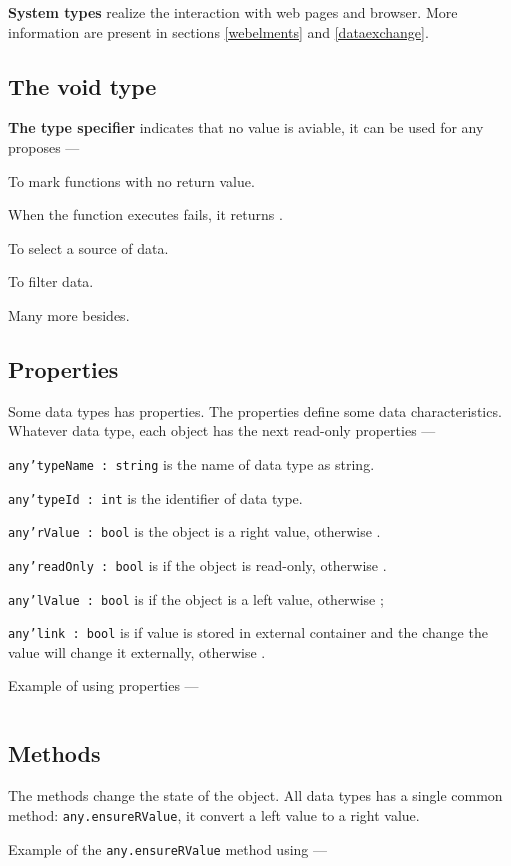 {\bf System types} realize the interaction with web pages and browser. More information are present in sections \ref{webelments} and \ref{dataexchange}.

\subsection{The {\color{lightblue} void} type}

{\bf The type specifier \void{}} indicates that no value is aviable, it can be used for any proposes —

\begin{icItems}
\item
	To mark functions with no return value.
\item
	When the function executes fails, it returns \void.
\item
	To select a source of data.
\item
	To filter data.
\item
	Many more besides.
\end{icItems}


\subsection{Properties}

Some data types has properties. The properties define some data characteristics.  Whatever data type, each object has the next read-only properties —

\begin{icItems}
\item
	\texttt{any'typeName : string} is the name of data type as string.
\item
	\texttt{any'typeId : int} is the identifier of data type.
\item
	\texttt{any'rValue : bool} is \true{} the object is a right value, otherwise \false{}.
\item
	\texttt{any'readOnly : bool} is \true{} if the object is read-only, otherwise \false{}.
\item
	\texttt{any'lValue : bool} is \true{} if the object is a left value, otherwise \false{};
\item
	\texttt{any'link : bool} is \true{} if value is stored in external container and the change the value will change it externally, otherwise \false{}.
\end{icItems}

Example of using properties —
\inputminted[linenos]{icl}{../sources/propertiesmain.icL}

\subsection{Methods}

The methods change the state of the object. All data types has a single common method: \texttt{any.ensureRValue}, it convert a left value to a right value.

Example of the \texttt{any.ensureRValue} method using —
\inputminted[linenos]{icl}{../sources/anyensureRValue.icL}

